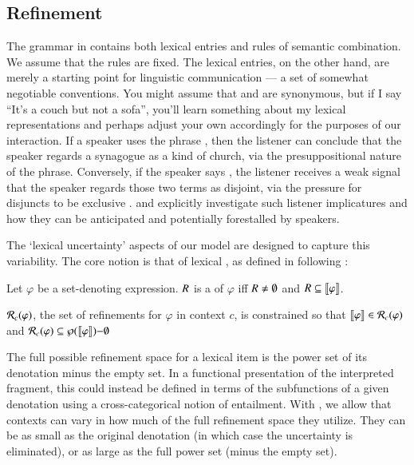 \documentclass[leqno,12pt]{article}
\begin{document}

\subsection{Refinement}\label{sec:refine}


The grammar in  contains both lexical entries and
rules of semantic combination. We assume that the rules are fixed.
The lexical entries, on the other hand, are merely a starting point
for linguistic communication --- a set of somewhat negotiable
conventions. You might assume that  and  are
synonymous, but if I say ``It's a couch but not a sofa'', you'll learn
something about my lexical representations and perhaps adjust your own
accordingly for the purposes of our interaction.  If a speaker uses
the phrase , then the listener can
conclude that the speaker regards a synagogue as a kind of church, via
the presuppositional nature of the phrase. Conversely, if the speaker
says , the listener receives a weak signal
that the speaker regards those two terms as disjoint, via the pressure
for disjuncts to be exclusive
\citep{Hurford:1974}. \citet{Chemla-HurfordCounts} and
\citet{Potts:Levy:2015} explicitly investigate such listener
implicatures and how they can be anticipated and potentially
forestalled by speakers.

The `lexical uncertainty' aspects of our model are designed to capture
this variability. The core notion is that of lexical
, as defined in  following \citet{Bergen:Levy:Goodman:2014}:
%
\begin{examples}
\item\label{refinement} 
  \begin{examples}
  \item Let $\varphi$ be a set-denoting expression. $R$ is a
     of $\varphi$ iff $R \neq \emptyset$ and
    $R \subseteq \llbracket\varphi\rrbracket$.
  \item\label{refine} $\mathcal{R}_{c}(\varphi)$, the set of refinements for
    $\varphi$ in context $c$, is constrained so that
    $\llbracket\varphi\rrbracket \in \mathcal{R}_{c}(\varphi)$ and
    $\mathcal{R}_{c}(\varphi) \subseteq \wp(\llbracket\varphi\rrbracket){-}\emptyset$
  \end{examples}
\end{examples}
%
The full possible refinement space for a lexical item is the power set
of its denotation minus the empty set. In a functional presentation of
the interpreted fragment, this could instead be defined in terms of
the subfunctions of a given denotation using a cross-categorical
notion of entailment. With , we allow that
contexts can vary in how much of the full refinement space they
utilize. They can be as small as the original denotation (in which
case the uncertainty is eliminated), or as large as the full power set
(minus the empty set).
\end{document}
